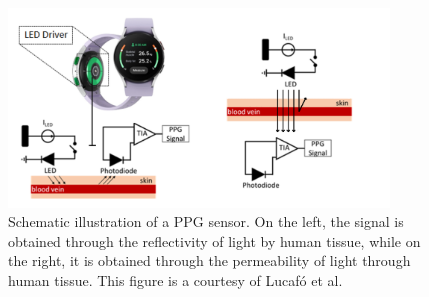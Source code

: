 \begin{figure}
	\centering
	\includegraphics[width=0.9\textwidth]{img/ppg.png}
	\caption{Schematic illustration of a \gls{PPG} sensor. On the left, the signal is obtained through the reflectivity of light by human tissue, while on the right, it is obtained through the permeability of light through human tissue. This figure is a courtesy of Lucafó et al.~\protect\cite{deep-learning-3}}
	\label{fig:method:ppg}
\end{figure}
